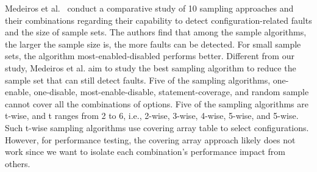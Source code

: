 Medeiros et al.~\cite{DBLP:conf/icse/MedeirosKRGA16} conduct a comparative study of 10 sampling approaches and their combinations regarding their capability to detect configuration-related faults and the size of sample sets. The authors find that among the sample algorithms, the larger the sample size is, the more faults can be detected. For small sample sets, the algorithm most-enabled-disabled performs better. Different from our study, Medeiros et al. aim to study the best sampling algorithm to reduce the sample set that can still detect faults.  Five of the sampling algorithms, one-enable, one-disable, most-enable-disable, statement-coverage, and random sample cannot cover all the combinations of options. Five of the sampling algorithms are t-wise, and t ranges from 2 to 6, i.e., 2-wise, 3-wise, 4-wise, 5-wise, and 5-wise. Such t-wise sampling algorithms use covering array table to select configurations. However, for performance testing, the covering array approach likely does not work since we want to isolate each combination's performance impact from others.

